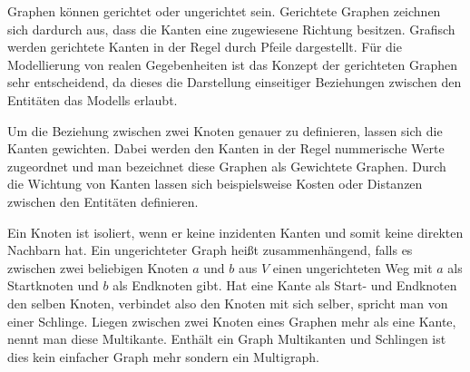 Graphen können gerichtet oder ungerichtet sein.
Gerichtete Graphen zeichnen sich dardurch aus, dass die Kanten eine zugewiesene Richtung besitzen.
Grafisch werden gerichtete Kanten in der Regel durch Pfeile dargestellt.
Für die Modellierung von realen Gegebenheiten ist das Konzept der gerichteten Graphen sehr entscheidend, da dieses die Darstellung einseitiger Beziehungen zwischen den Entitäten das Modells erlaubt.

Um die Beziehung zwischen zwei Knoten genauer zu definieren, lassen sich die Kanten gewichten.
Dabei werden den Kanten in der Regel nummerische Werte zugeordnet und man bezeichnet diese Graphen als Gewichtete Graphen.
Durch die Wichtung von Kanten lassen sich beispielsweise Kosten oder Distanzen zwischen den Entitäten definieren.

Ein Knoten ist isoliert, wenn er keine inzidenten Kanten und somit keine direkten Nachbarn hat.\cite{knauer2015diskrete}
Ein ungerichteter Graph heißt zusammenhängend, falls es zwischen zwei beliebigen Knoten $a$ und $b$ aus $V$ einen ungerichteten Weg mit $a$ als Startknoten und $b$ als Endknoten gibt.\cite[36-38]{krumke2012graphentheoretische}
Hat eine Kante als Start- und Endknoten den selben Knoten, verbindet also den Knoten mit sich selber, spricht man von einer Schlinge.
Liegen zwischen zwei Knoten eines Graphen mehr als eine Kante, nennt man diese Multikante.
Enthält ein Graph Multikanten und Schlingen ist dies kein einfacher Graph mehr sondern ein Multigraph.\cite{felsner01}

